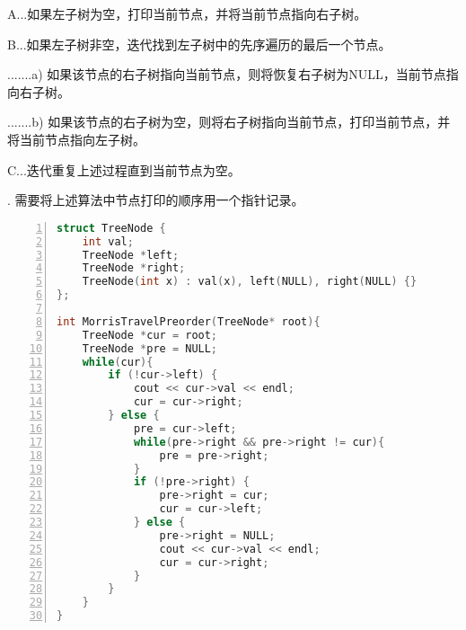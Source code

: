A...如果左子树为空，打印当前节点，并将当前节点指向右子树。

B...如果左子树非空，迭代找到左子树中的先序遍历的最后一个节点。

.......a) 如果该节点的右子树指向当前节点，则将恢复右子树为NULL，当前节点指向右子树。

.......b) 如果该节点的右子树为空，则将右子树指向当前节点，打印当前节点，并将当前节点指向左子树。

C...迭代重复上述过程直到当前节点为空。

. 需要将上述算法中节点打印的顺序用一个指针记录。

\begin{lstlisting}[language=c++,numbers=left,firstnumber = 1,numberstyle=\tiny,breaklines = true,keywordstyle=\color{blue!70},commentstyle=\color{red!50!green!50!blue!50},frame=shadowbox, rulesepcolor=\color{red!20!green!20!blue!20}]
struct TreeNode {
    int val;
    TreeNode *left;
    TreeNode *right;
    TreeNode(int x) : val(x), left(NULL), right(NULL) {}
};

int MorrisTravelPreorder(TreeNode* root){
    TreeNode *cur = root;
    TreeNode *pre = NULL;
    while(cur){
        if (!cur->left) {
            cout << cur->val << endl;
            cur = cur->right;
        } else {
            pre = cur->left;
            while(pre->right && pre->right != cur){
                pre = pre->right;
            }
            if (!pre->right) {
                pre->right = cur;
                cur = cur->left;
            } else {
                pre->right = NULL;
                cout << cur->val << endl;
                cur = cur->right;
            }
        }
    }
}
\end{lstlisting}